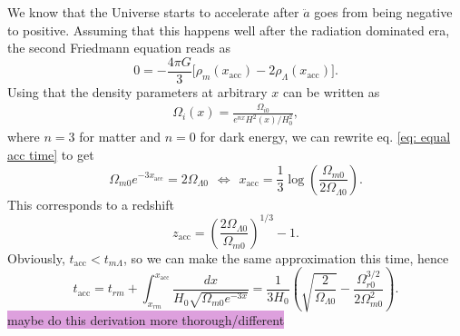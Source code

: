 \documentclass{aa}
\begin{document}
We know that the Universe starts to accelerate after $\ddot{a}$ goes from being negative to positive. Assuming that this happens well after the radiation dominated era, the second Friedmann equation reads as 
\begin{equation}
  0 = - \frac{4\pi G}{3}\Big[\rho_m(x_\text{acc})- 2\rho_\Lambda(x_\text{acc})\Big]. \label{eq: equal acc time}
\end{equation}
Using that the density parameters at arbitrary $x$ can be written as
\begin{align}
  \Omega_i(x) = \frac{\Omega_{i0}}{e^{nx}H^2(x)/H_0^2},
\end{align}
where $n = 3$ for matter and $n=0$ for dark energy, we can rewrite eq. \eqref{eq: equal acc time} to get
\begin{equation}
  \Omega_{m0}e^{-3x_\text{acc}} = 2\Omega_{\Lambda0}
  \hspace{5pt}\Leftrightarrow\hspace{5pt}
  x_\text{acc} = \frac{1}{3}\log\left(\frac{\Omega_{m0}}{2\Omega_{\Lambda0}}\right).
\end{equation}
This corresponds to a redshift
\begin{equation}
  z_\text{acc} = \left(\frac{2\Omega_{\Lambda0}}{\Omega_{m0}}\right)^{1/3}-1.
\end{equation}
Obviously, $t_\text{acc}<t_{m\Lambda}$, so we can make the same approximation this time, hence
\begin{equation}
  t_\text{acc} = t_{rm} + \int^{x_\text{acc}}_{x_{rm}}\frac{dx}{H_0\sqrt{\Omega_{m0}e^{-3x}}} = \frac{1}{3H_0}\left(\sqrt{\frac{2}{\Omega_{\Lambda0}}} -\frac{\Omega_{r0}^{3/2}}{2\Omega_{m0}^2}\right).
\end{equation}
\colorbox{Plum}{maybe do this derivation more thorough/different}
\end{document}
